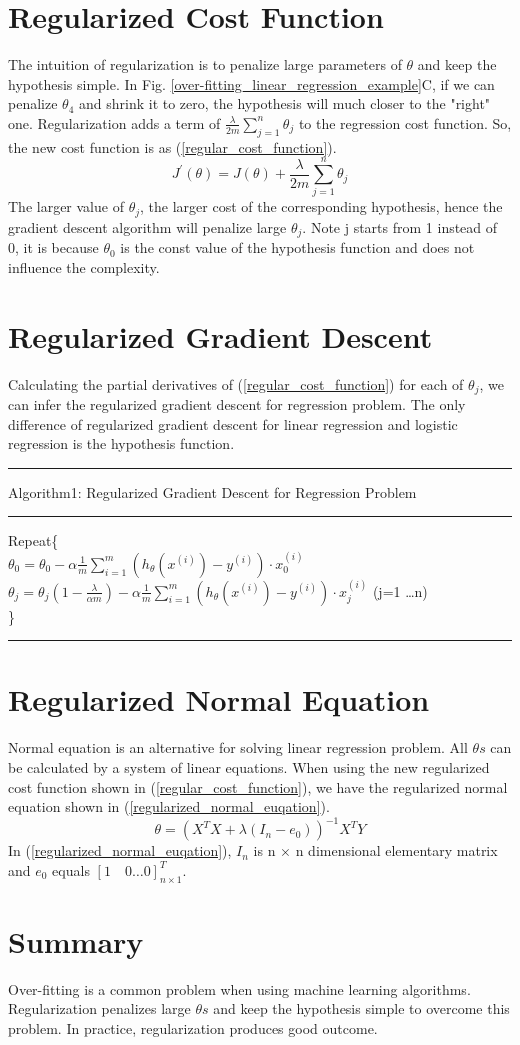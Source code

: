 \documentclass{article}
\begin{document}
\section{Regularized Cost Function}
The intuition of regularization is to penalize large parameters of $\theta$ and keep the hypothesis simple. In Fig. \ref{over-fitting_linear_regression_example}C, if we can penalize $\theta_{4}$ and shrink it to zero, the hypothesis will much closer to the "right" one. Regularization adds a term of $\frac{\lambda}{2m} \sum_{j=1}^{n}\theta_{j}$ to the regression cost function. So, the new cost function is as (\ref{regular_cost_function}).
\begin{equation}\label{regular_cost_function}
J^{'}(\theta) = J(\theta) + \frac{\lambda}{2m} \sum_{j=1}^{n}\theta_{j}
\end{equation}
The larger value of $\theta_{j}$, the larger cost of the corresponding hypothesis, hence the gradient descent algorithm will penalize large $\theta_{j}$. Note j starts from 1 instead of 0, it is because $\theta_{0}$ is the const value of the hypothesis function and does not influence the complexity.

\section{Regularized Gradient Descent}
Calculating the partial derivatives of (\ref{regular_cost_function}) for each of $\theta_{j}$, we can infer the regularized gradient descent for regression problem. The only difference of regularized gradient descent for linear regression and logistic regression is the hypothesis function.
\smallskip
\hrule
\smallskip
Algorithm1: Regularized Gradient Descent for Regression Problem
\smallskip
\hrule
\smallskip
Repeat\{\\
$\theta_0=\theta_0 - \alpha \frac{1}{m} \sum_{i=1}^{m}(h_\theta(x^{(i)})-y^{(i)}) \cdot x^{(i)}_{0}$\\
$\theta_j=\theta_j(1 - \frac{\lambda}{\alpha m}) - \alpha \frac{1}{m} \sum_{i=1}^{m}(h_\theta(x^{(i)})-y^{(i)}) \cdot x^{(i)}_{j}$ (j=1 \ldots n)\\
\}\\
\hrule
\section{Regularized Normal Equation}
Normal equation is an alternative for solving linear regression problem. All $\theta s$ can be calculated by a system of linear equations. When using the new regularized cost function shown in (\ref{regular_cost_function}), we have the regularized normal equation shown in (\ref{regularized_normal_euqation}).
\begin{equation}\label{regularized_normal_euqation}
\theta = (X^{T}X + \lambda(I_{n} - e_{0}))^{-1}X^{T}Y
\end{equation}
In (\ref{regularized_normal_euqation}), $I_{n}$ is n $\times$ n dimensional elementary matrix and $e_{0}$ equals $[1 \quad 0 \ldots 0]_{n \times 1}^{T}$.

\section{Summary}
Over-fitting is a common problem when using machine learning algorithms. Regularization penalizes large $\theta s$ and keep the hypothesis simple to overcome this problem. In practice, regularization produces good outcome. 
\end{document}
